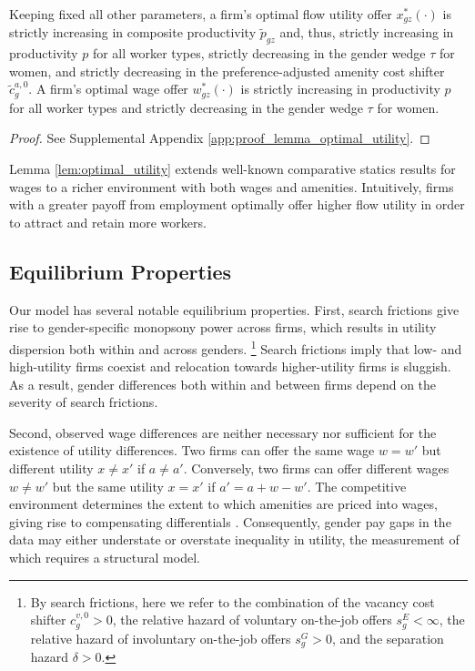 %
\newcommand{\OptimalFlowPayoffs}{%
    Keeping fixed all other parameters, a firm's optimal flow utility offer $x_{gz}^{*}(\cdot)$ is strictly increasing in composite productivity $\tilde{p}_{gz}$ and, thus, strictly increasing in productivity $p$ for all worker types, strictly decreasing in the gender wedge $\tau$ for women, and strictly decreasing in the preference-adjusted amenity cost shifter $\tilde{c}_{g}^{a,0}$. %
    A firm's optimal wage offer $w_{gz}^{*}(\cdot)$ is strictly increasing in productivity $p$ for all worker types and strictly decreasing in the gender wedge $\tau$ for women.%
}
%
\begin{lemma}
    \label{lem:optimal_utility}
    \OptimalFlowPayoffs
\end{lemma}
%
\begin{proof}
    See Supplemental Appendix \ref{app:proof_lemma_optimal_utility}.
\end{proof}
%
Lemma \ref{lem:optimal_utility} extends well-known comparative statics results for wages \citep[e.g.,][]{BontempsRobinvandenBerg1999, BontempsRobinvandenBerg2000} to a richer environment with both wages and amenities. Intuitively, firms with a greater payoff from employment optimally offer higher flow utility in order to attract and retain more workers.


\subsection{Equilibrium Properties}

Our model has several notable equilibrium properties. %
%
First, search frictions give rise to gender-specific monopsony power across firms, which results in utility dispersion both within and across genders.%
%
\footnote{By search frictions, here we refer to the combination of the vacancy cost shifter $c_{g}^{v,0} > 0$, the relative hazard of voluntary on-the-job offers $s_{g}^{E} < \infty$, the relative hazard of involuntary on-the-job offers $s_{g}^{G} > 0$, and the separation hazard $\delta > 0$.} %
%
Search frictions imply that low- and high-utility firms coexist and relocation towards higher-utility firms is sluggish. As a result, gender differences both within and between firms depend on the severity of search frictions.

Second, observed wage differences are neither necessary nor sufficient for the existence of utility differences. Two firms can offer the same wage $w = w'$ but different utility $x \neq x'$ if $a \neq a'$. Conversely, two firms can offer different wages $w \neq w'$ but the same utility $x = x'$ if $a' = a + w - w'$. The competitive environment determines the extent to which amenities are priced into wages, giving rise to compensating differentials \citep{Rosen1986}. Consequently, gender pay gaps in the data may either understate or overstate inequality in utility, the measurement of which requires a structural model.

